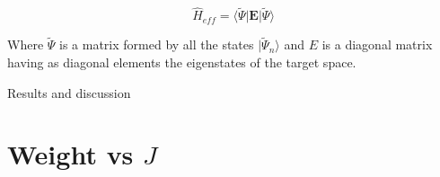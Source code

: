 \documentclass[12pt,twoside]{report}
\begin{document}
	\begin{equation}
	    \hat{H}_{eff}=\langle \tilde{\Psi} | \mathbf{E} | \tilde{\Psi} \rangle
	\end{equation}

	Where $\tilde{\Psi}$ is a matrix formed by all the states $|\tilde{\Psi}_n\rangle$ and $E$ is a
	diagonal matrix having as diagonal elements the eigenstates of the target
	space.

	
	\begin{chapter}{Results and discussion}
	
	
	
	\section{Weight vs $J$}

\end{chapter}
\end{document}
